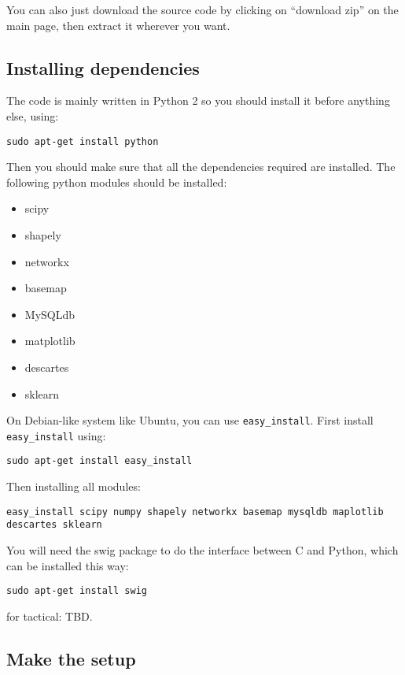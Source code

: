 \documentclass[12pt]{article}
\begin{document}
You can also just download the source code by clicking on ``download zip'' on the main page, then extract it wherever you want.

\subsection{Installing dependencies}

The code is mainly written in Python 2 so you should install it before anything else, using:

\begin{verbatim}
sudo apt-get install python
\end{verbatim}

Then you should make sure that all the dependencies required are installed. The following python modules should be installed:

\begin{itemize}
\item scipy
\item shapely
\item networkx
\item basemap
\item MySQLdb
\item matplotlib
\item descartes
\item sklearn
\end{itemize}

On Debian-like system like Ubuntu, you can use \verb|easy_install|. First install \verb|easy_install| using:

\begin{verbatim}
sudo apt-get install easy_install 
\end{verbatim}

Then installing all modules:

\begin{verbatim}
easy_install scipy numpy shapely networkx basemap mysqldb maplotlib descartes sklearn
\end{verbatim}

You will need the swig package to do the interface between C and Python, which can be installed this way:
\begin{verbatim}
sudo apt-get install swig
\end{verbatim}

for tactical: TBD.

\subsection{Make the setup}
\end{document}
